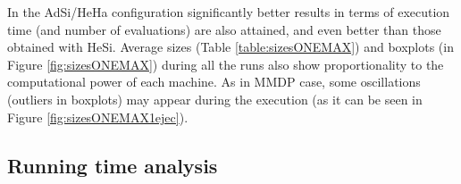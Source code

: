 \documentclass[final,1p,times]{elsarticle}
\begin{document}








In the AdSi/HeHa configuration significantly better results in terms of execution time (and number of evaluations) are also attained, and even better than those obtained with HeSi. Average sizes (Table \ref{table:sizesONEMAX}) and boxplots (in Figure \ref{fig:sizesONEMAX}) during all the runs also show proportionality to the computational power of each machine. As in MMDP case, some oscillations (outliers in boxplots) may appear during the execution (as it can be seen in Figure \ref{fig:sizesONEMAX1ejec}).



\begin{table}
\end{table}










\subsection{Running time analysis}
\end{document}
